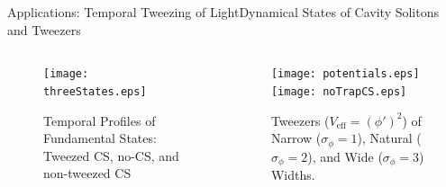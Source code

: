 \begin{frame}[c]{Applications: Temporal Tweezing of Light}{Dynamical States of Cavity Solitons and Tweezers}
\begin{columns}
\begin{column}{0.5\textwidth}
\begin{figure}[H]
\centering
\centerline{\texttt{[image: threeStates.eps]}}
\caption{Temporal Profiles of Fundamental States:  Tweezed CS, no-CS, and non-tweezed CS}
\end{figure}
\end{column}
\begin{column}{0.3\textwidth}
\begin{figure}[p!]
\centering
\texttt{[image: potentials.eps]}\\
\texttt{[image: noTrapCS.eps]}
\caption{ \textcolor{paleblue}{Tweezers} ($V_{\mathrm{eff}} = (\phi')^2$) of Narrow ($\sigma_\phi = 1$), Natural ($\sigma_\phi = 2$), 
and Wide ($\sigma_\phi = 3$) Widths.
}
\end{figure}
\end{column}
\end{columns}
\end{frame}

